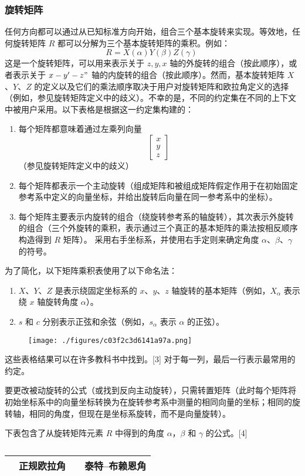 \subsubsection{旋转矩阵}  
任何方向都可以通过从已知标准方向开始，组合三个基本旋转来实现。等效地，任何旋转矩阵 \( R \) 都可以分解为三个基本旋转矩阵的乘积。例如：
\[
R = X(\alpha) Y(\beta) Z(\gamma)~
\]
这是一个旋转矩阵，可以用来表示关于 $z,y,x$ 轴的外旋转的组合（按此顺序），或者表示关于 $x-y'-z"$ 轴的内旋转的组合（按此顺序）。然而，基本旋转矩阵 \( X \)、\( Y \)、\( Z \) 的定义以及它们的乘法顺序取决于用户对旋转矩阵和欧拉角定义的选择（例如，参见旋转矩阵定义中的歧义）。不幸的是，不同的约定集在不同的上下文中被用户采用。以下表格是根据这一约定集构建的：
\begin{enumerate}
\item 每个矩阵都意味着通过左乘列向量  
\[
\begin{bmatrix} x \\ y \\ z \end{bmatrix}~
\]  
（参见旋转矩阵定义中的歧义）
\item 每个矩阵都表示一个主动旋转（组成矩阵和被组成矩阵假定作用于在初始固定参考系中定义的向量坐标，并给出旋转后向量在同一参考系中的坐标）。
\item 每个矩阵主要表示内旋转的组合（绕旋转参考系的轴旋转），其次表示外旋转的组合（三个外旋转的乘积，表示通过三个真正的基本矩阵的乘法按相反顺序构造得到 \( R \) 矩阵）。
采用右手坐标系，并使用右手定则来确定角度 \( \alpha \)、\( \beta \)、\( \gamma \) 的符号。
\end{enumerate}
为了简化，以下矩阵乘积表使用了以下命名法：
\begin{enumerate}
\item \( X \)、\( Y \)、\( Z \) 是表示绕固定坐标系的 \( x \)、\( y \)、\( z \) 轴旋转的基本矩阵（例如，\( X_\alpha \) 表示绕 \( x \) 轴旋转角度 \( \alpha \)）。
\item \( s \) 和 \( c \) 分别表示正弦和余弦（例如，\( s_\alpha \) 表示 \( \alpha \) 的正弦）。
\end{enumerate}

\begin{figure}[ht]
\centering
\texttt{[image: ./figures/c03f2c3d6141a97a.png]}
\caption{} \label{fig_OLJ_11}
\end{figure}

这些表格结果可以在许多教科书中找到。[3] 对于每一列，最后一行表示最常用的约定。

要更改被动旋转的公式（或找到反向主动旋转），只需转置矩阵（此时每个矩阵将初始坐标系中的向量坐标转换为在旋转参考系中测量的相同向量的坐标；相同的旋转轴，相同的角度，但现在是坐标系旋转，而不是向量旋转）。

下表包含了从旋转矩阵元素 \( R \) 中得到的角度 \(\alpha\)，\(\beta\) 和 \(\gamma\) 的公式。[4]

\begin{table}[ht]
\centering
\caption\label{OLJ}
\begin{tabular}{|c|c||c|c|}
\hline
&\textbf{正规欧拉角}& &\textbf{泰特–布赖恩角}\\


\hline 
\end{tabular}
\end{table}